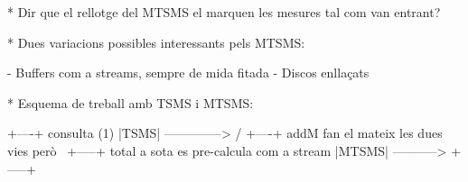 * Dir que el rellotge del MTSMS el marquen les mesures tal com van entrant?

* Dues variacions possibles interessants pels MTSMS:

 
  - Buffers com a streams, sempre de mida fitada 
  - Discos enllaçats

* Esquema de treball amb TSMS i MTSMS:


        +----+  consulta (1)
        |TSMS| --------------> 
     /  +----+
addM                              fan el mateix les dues vies però
     \  +-----+  total            a sota es pre-calcula com a stream
        |MTSMS| -----------> 
        +-----+











